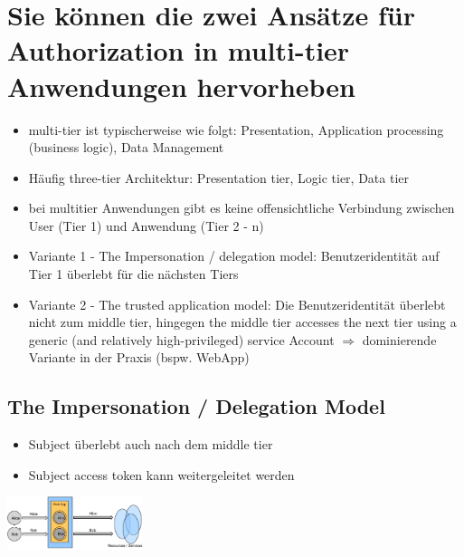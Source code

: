 \documentclass{report}
\newenvironment{Figure}
	{\par\medskip\noindent\minipage{\linewidth}}
	{\endminipage\par\medskip}
\theoremstyle{definition}
\theoremstyle{example}
\begin{document}
\section{Sie können die zwei Ansätze für Authorization in multi-tier Anwendungen hervorheben}

\begin{itemize}
	\item multi-tier ist typischerweise wie folgt: Presentation, Application processing (business logic), Data Management
	\item Häufig three-tier Architektur: Presentation tier, Logic tier, Data tier
	\item bei multitier Anwendungen gibt es keine offensichtliche Verbindung zwischen User (Tier 1) und Anwendung (Tier 2 - n)
	\item Variante 1 - The Impersonation / delegation model: Benutzeridentität auf Tier 1 überlebt für die nächsten Tiers
	\item Variante 2 - The trusted application model: Die Benutzeridentität überlebt nicht zum middle tier, hingegen the middle tier accesses the next tier using a generic (and relatively high-privileged) service Account $\Rightarrow$ dominierende Variante in der Praxis (bspw. WebApp)	
\end{itemize}

	\subsection{The Impersonation / Delegation Model}
\begin{itemize}
	\item Subject überlebt auch nach dem middle tier
	\item Subject access token kann weitergeleitet werden
\end{itemize}
\begin{Figure}
\centering
\includegraphics[width=150px]{img/impersonation.png}
	\label{fig:Abbildung Schema Impersonation Model}
\end{Figure}
\end{document}

